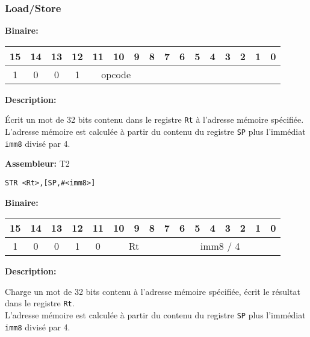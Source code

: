 \documentclass{article}
\begin{document}
    \subsubsection{Load/Store}
    \label{subsubsec:LoadStore}

    \textbf{Binaire:}

    \begin{tabular}{| c c c c c c c c c c c c c c c c |}
        \hline
        15 & 14 & 13 & 12 & \multicolumn{1}{|c}{11} & 10 & 9 & \multicolumn{1}{|c}{8} & 7 & 6 & 5 & 4 & 3 & 2 & 1 & 0 \\
        \hline
        1 & 0 & 0 & 1 & \multicolumn{3}{|c}{opcode} & \multicolumn{9}{|c|}{} \\
        \hline
    \end{tabular}


    \textbf{Description: }

    Écrit un mot de 32 bits contenu dans le registre \texttt{Rt} à l'adresse mémoire spécifiée.\\
    L'adresse mémoire est calculée à partir du contenu du registre \texttt{SP} plus l'immédiat \texttt{imm8} divisé par 4.

    \textbf{Assembleur:} T2

    \begin{lstlisting}
STR <Rt>,[SP,#<imm8>]
    \end{lstlisting}

    \textbf{Binaire:}

    \begin{tabular}{| c c c c c c c c c c c c c c c c |}
        \hline
        15 & 14 & 13 & 12 & \multicolumn{1}{|c}{11} & \multicolumn{1}{|c}{10} & 9 & 8 & \multicolumn{1}{|c}{7} & 6 & 5 & 4 & 3 & 2 & 1 & 0 \\
        \hline
        1 & 0 & 0 & 1 & \multicolumn{1}{|c}{0} & \multicolumn{3}{|c}{Rt} & \multicolumn{8}{|c|}{imm8 / 4} \\
        \hline
    \end{tabular}



    \textbf{Description: }

    Charge un mot de 32 bits contenu à l'adresse mémoire spécifiée, écrit le résultat dans le registre \texttt{Rt}.\\
    L'adresse mémoire est calculée à partir du contenu du registre \texttt{SP} plus l'immédiat \texttt{imm8} divisé par 4.
\end{document}
